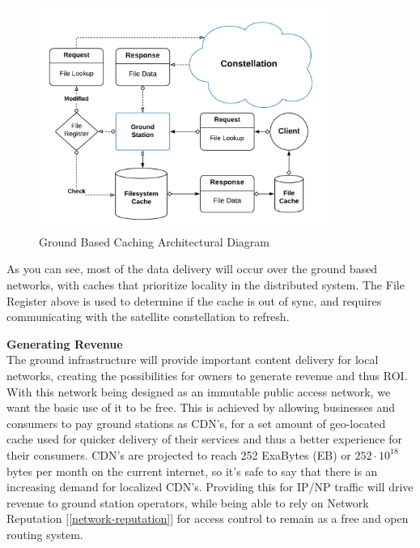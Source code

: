 \documentclass[11pt]{article}
\begin{document}
\begin{figure}[h]
    \centering
    \includegraphics[width=0.85\textwidth]{./images/rsz_ground_caching.png}
    \vspace{-10pt}
    \caption{Ground Based Caching Architectural Diagram}
\end{figure}

\noindent As you can see, most of the data delivery will occur over the ground based networks, with caches that prioritize locality in the distributed system.
The File Register above is used to determine if the cache is out of sync, and requires communicating with the satellite constellation to refresh.

\bigskip
{\noindent\textbf{Generating Revenue}} \\

\noindent The ground infrastructure will provide important content delivery for local networks, creating the possibilities for owners to generate revenue and thus ROI.
With this network being designed as an immutable public access network, we want the basic use of it to be free.
This is achieved by allowing businesses and consumers to pay ground stations as CDN's, for a set amount of geo-located cache used for quicker delivery of their services and thus a better experience for their consumers. 
CDN's are projected to reach 252 ExaBytes (EB) or $252 \cdot 10^{18}$ bytes per month \cite{CDN-usage} on the current internet, so it's safe to say that there is an increasing demand for localized CDN's.
Providing this for IP/NP traffic will drive revenue to ground station operators, while being able to rely on Network Reputation [\ref{network-reputation}] for access control to remain as a free and open routing system.
\bigskip
\end{document}
